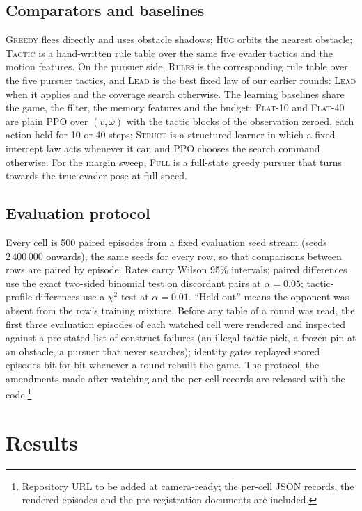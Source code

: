 \documentclass[conference]{IEEEtran}
\newcommand{\pol}[1]{\textsc{#1}}
\begin{document}
\subsection{Comparators and baselines}
\pol{Greedy} flees directly and uses obstacle shadows; \pol{Hug} orbits the nearest obstacle; \pol{Tactic} is a hand-written rule table over the same five evader tactics and the motion features. On the pursuer side, \pol{Rules} is the corresponding rule table over the five pursuer tactics, and \pol{Lead} is the best fixed law of our earlier rounds: \pol{Lead} when it applies and the coverage search otherwise. The learning baselines share the game, the filter, the memory features and the budget: \pol{Flat-10} and \pol{Flat-40} are plain PPO over $(v,\omega)$ with the tactic blocks of the observation zeroed, each action held for 10 or 40 steps; \pol{Struct} is a structured learner in which a fixed intercept law acts whenever it can and PPO chooses the search command otherwise. For the margin sweep, \pol{Full} is a full-state greedy pursuer that turns towards the true evader pose at full speed.

\subsection{Evaluation protocol}
Every cell is 500 paired episodes from a fixed evaluation seed stream (seeds $2\,400\,000$ onwards), the same seeds for every row, so that comparisons between rows are paired by episode. Rates carry Wilson 95\% intervals; paired differences use the exact two-sided binomial test on discordant pairs at $\alpha=0.05$; tactic-profile differences use a $\chi^2$ test at $\alpha=0.01$. ``Held-out'' means the opponent was absent from the row's training mixture. Before any table of a round was read, the first three evaluation episodes of each watched cell were rendered and inspected against a pre-stated list of construct failures (an illegal tactic pick, a frozen pin at an obstacle, a pursuer that never searches); identity gates replayed stored episodes bit for bit whenever a round rebuilt the game. The protocol, the amendments made after watching and the per-cell records are released with the code.\footnote{Repository URL to be added at camera-ready; the per-cell JSON records, the rendered episodes and the pre-registration documents are included.}

\section{Results}
\label{sec:results}
\end{document}
